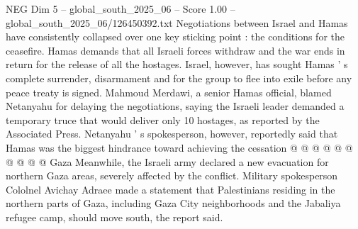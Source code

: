 \begin{textsample}{NEG Dim 5 – global\_south\_2025\_06 – Score 1.00 – global\_south\_2025\_06/126450392.txt}
Negotiations between Israel and Hamas have consistently collapsed over one key sticking point : the conditions for the ceasefire.
Hamas demands that all Israeli forces withdraw and the war ends in return for the release of all the hostages.
Israel, however, has sought Hamas ' s complete surrender, disarmament and for the group to flee into exile before any peace treaty is signed.
Mahmoud Merdawi, a senior Hamas official, blamed Netanyahu for delaying the negotiations, saying the Israeli leader demanded a temporary truce that would deliver only 10 hostages, as reported by the Associated Press.
Netanyahu ' s spokesperson, however, reportedly said that Hamas was the biggest hindrance toward achieving the cessation @ @ @ @ @ @ @ @ @ @ Gaza Meanwhile, the Israeli army declared a new evacuation for northern Gaza areas, severely affected by the conflict.
Military spokesperson Cololnel Avichay Adraee made a statement that Palestinians residing in the northern parts of Gaza, including Gaza City neighborhoods and the Jabaliya refugee camp, should move south, the report said.

\end{textsample}
